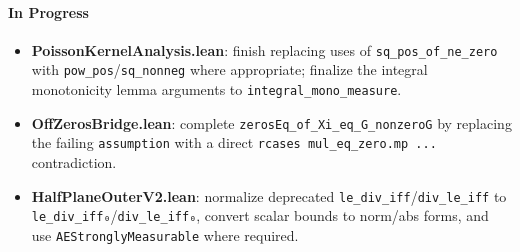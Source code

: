\paragraph{In Progress}
\begin{itemize}
  \item \textbf{PoissonKernelAnalysis.lean}: finish replacing uses of \texttt{sq\_pos\_of\_ne\_zero} with \texttt{pow\_pos}/\texttt{sq\_nonneg} where appropriate; finalize the integral monotonicity lemma arguments to \texttt{integral\_mono\_measure}.
  \item \textbf{OffZerosBridge.lean}: complete \texttt{zerosEq\_of\_Xi\_eq\_G\zeta\_nonzeroG} by replacing the failing \texttt{assumption} with a direct \texttt{rcases mul\_eq\_zero.mp ...} contradiction.
  \item \textbf{HalfPlaneOuterV2.lean}: normalize deprecated \texttt{le\_div\_iff}/\texttt{div\_le\_iff} to \texttt{le\_div\_iff₀}/\texttt{div\_le\_iff₀}, convert scalar bounds to norm/abs forms, and use \texttt{AEStronglyMeasurable} where required.
\end{itemize}

